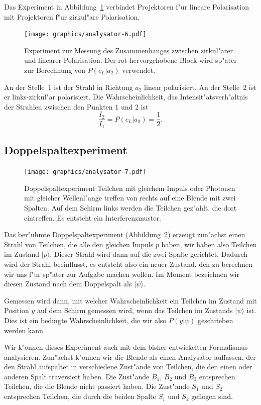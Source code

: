 Das Experiment in Abbildung~\ref{skript:linear-zirkulaer} verbindet
Projektoren f"ur lineare Polarisation mit Projektoren f"ur zirkul"are
Polarisation.
\begin{figure}
\centering
\texttt{[image: graphics/analysator-6.pdf]}
\caption{Experiment zur Messung des Zusammenhanges zwischen zirkul"arer
und linearer Polarisation. Der rot hervorgehobene Block wird sp"ater
zur Berechnung von $P(c_L|a_2)$ verwendet.
\label{skript:linear-zirkulaer}}
\end{figure}
An der Stelle~1 ist der Strahl in Richtung $a_2$ linear polarisiert.
An der Stelle~2 ist er links-zirkul"ar polarisiert. Die Wahrscheinlichkeit,
das Intensit"atsverh"altnis der Strahlen zwischen den Punkten $1$ und $2$
ist
\begin{equation}
\frac{I_2}{I_1}=P(c_L|a_2)=\frac12.
\label{skript:intensitaetsverhaeltnis}
\end{equation}

\subsection{Doppelspaltexperiment}
\begin{figure}
\centering
\texttt{[image: graphics/analysator-7.pdf]}
\caption{Doppelspaltexperiment Teilchen mit gleichem Impuls oder Photonen
mit gleicher Wellenl"ange treffen von rechts auf eine Blende mit zwei
Spalten. Auf dem Schirm links werden die Teilchen gez"ahlt, die dort
eintreffen. Es entsteht ein Interferenzmuster.
\label{skript:doppelspalt-bild}}
\end{figure}
Das ber"uhmte Doppelspaltexperiment (Abbildung~\ref{skript:doppelspalt-bild})
erzeugt zun"achst einen Strahl
von Teilchen, die alle den gleichen Impuls $p$ haben, wir haben also
Teilchen im Zustand $|p\rangle$. Dieser Strahl
wird dann auf die zwei Spalte gerichtet. Dadurch wird der Strahl
beeinflusst, es entsteht also ein neuer Zustand, den zu berechnen
wir uns f"ur sp"ater zur Aufgabe machen wollen.
Im Moment bezeichnen wir diesen Zustand nach dem Doppelspalt 
als $|\psi\rangle$.

Gemessen wird dann, mit welcher Wahrscheinlichkeit
ein Teilchen im Zustand mit Position $y$ auf dem Schirm
gemessen wird, wenn das Teilchen im Zustands $|\psi\rangle$
ist. Dies ist ein bedingte Wahrscheinlichkeit, die wir also
$P(y|\psi)$ geschrieben werden kann.

Wir k"onnen dieses Experiment auch mit dem bisher entwickelten
Formalismus analysieren.
Zun"achst k"onnen wir die Blende als einen Analysator auffassen, der
den Strahl aufspaltet in verschiedene Zust"ande von Teilchen, die
den einen oder anderen Spalt traversiert haben.
Die Zust"ande $B_1$, $B_2$ und $B_3$ entsprechen Teilchen, die die
Blende nicht passiert haben. Die Zust"ande $S_1$ und $S_2$ entsprechen
Teilchen, die durch die beiden Spalte $S_1$ und $S_2$ geflogen sind.

